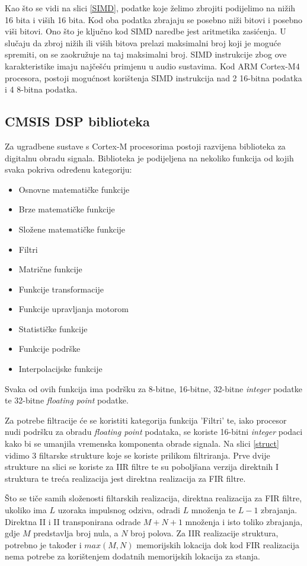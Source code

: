 \documentclass[times, utf8, diplomski]{fer}
\begin{document}
Kao što se vidi na slici \ref{SIMD}, podatke koje želimo zbrojiti podijelimo na nižih 16 bita i viših 16 bita. Kod oba podatka zbrajaju se posebno niži bitovi i posebno viši bitovi. Ono što je ključno kod SIMD naredbe jest aritmetika zasićenja. U slučaju da zbroj nižih ili viših bitova prelazi maksimalni broj koji je moguće spremiti, on se zaokružuje na taj maksimalni broj. SIMD instrukcije zbog ove karakteristike imaju najčešću primjenu u audio sustavima. Kod ARM Cortex-M4 procesora, postoji mogućnost korištenja SIMD instrukcija nad 2 16-bitna podatka i 4 8-bitna podatka.

\subsection{CMSIS DSP biblioteka}
Za ugradbene sustave s Cortex-M procesorima postoji razvijena biblioteka za digitalnu obradu signala. Biblioteka je podijeljena na nekoliko funkcija od kojih svaka pokriva određenu kategoriju:

\begin{itemize}
\item Osnovne matematičke funkcije
\item Brze matematičke funkcije
\item Složene matematičke funkcije
\item Filtri
\item Matrične funkcije
\item Funkcije transformacije
\item Funkcije upravljanja motorom
\item Statističke funkcije
\item Funkcije podrške
\item Interpolacijske funkcije
\end{itemize}

Svaka od ovih funkcija ima podršku za 8-bitne, 16-bitne, 32-bitne \textit{integer} podatke te 32-bitne \textit{floating point} podatke.

Za potrebe filtracije će se koristiti kategorija funkcija 'Filtri' te, iako procesor nudi podršku za obradu \textit{floating point} podataka, se koriste 16-bitni \textit{integer} podaci kako bi se umanjila vremenska komponenta obrade signala. Na slici \ref{struct} vidimo 3 filtarske strukture koje se koriste prilikom filtriranja. Prve dvije strukture na slici se koriste za IIR filtre te su poboljšana verzija direktnih I struktura te treća realizacija jest direktna realizacija za FIR filtre.

Što se tiče samih složenosti filtarskih realizacija, direktna realizacija za FIR filtre, ukoliko ima $L$ uzoraka impulsnog odziva, odradi $L$ množenja te $L-1$ zbrajanja. Direktna II i II transponirana odrade $M + N + 1$ množenja i isto toliko zbrajanja, gdje $M$ predstavlja broj nula, a $N$ broj polova. Za IIR realizacije struktura, potrebno je također i $max(M,N)$ memorijskih lokacija dok kod FIR realizacija nema potrebe za korištenjem dodatnih memorijskih lokacija za stanja.
\end{document}
